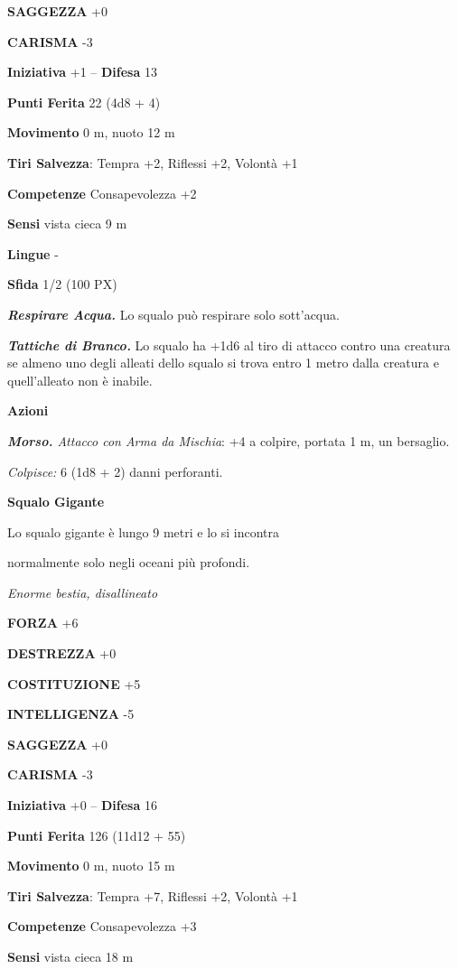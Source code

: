 \begin{multicols}{2}
	\textbf{SAGGEZZA} +0

	\textbf{CARISMA} -3

	\textbf{Iniziativa} +1 -- \textbf{Difesa} 13

	\textbf{Punti Ferita} 22 (4d8 + 4)

	\textbf{Movimento} 0 m, nuoto 12 m

	\textbf{Tiri Salvezza}: Tempra +2, Riflessi +2, Volontà +1

	\textbf{Competenze} Consapevolezza +2

	\textbf{Sensi} vista cieca 9 m

	\textbf{Lingue} -

	\textbf{Sfida} 1/2 (100 PX)

	\textit{\textbf{Respirare Acqua.}} Lo squalo può respirare solo sott'acqua.

	\textit{\textbf{Tattiche di Branco.}} Lo squalo ha +1d6 al tiro di attacco contro una creatura se almeno uno degli alleati dello squalo si trova entro 1 metro dalla creatura e quell'alleato non è inabile.

	\textbf{Azioni}

	\textit{\textbf{Morso.} Attacco con Arma da Mischia}: +4 a colpire, portata 1 m, un bersaglio.

	\textit{Colpisce:} 6 (1d8 + 2) danni perforanti.

	\medskip\textbf{Squalo Gigante}

	Lo squalo gigante è lungo 9 metri e lo si incontra

	normalmente solo negli oceani più profondi.

	\textit{Enorme bestia, disallineato}

	\textbf{FORZA} +6

	\textbf{DESTREZZA} +0

	\textbf{COSTITUZIONE} +5

	\textbf{INTELLIGENZA} -5

	\textbf{SAGGEZZA} +0

	\textbf{CARISMA} -3

	\textbf{Iniziativa} +0 -- \textbf{Difesa} 16

	\textbf{Punti Ferita} 126 (11d12 + 55)

	\textbf{Movimento} 0 m, nuoto 15 m

	\textbf{Tiri Salvezza}: Tempra +7, Riflessi +2, Volontà +1

	\textbf{Competenze} Consapevolezza +3

	\textbf{Sensi} vista cieca 18 m


\end{multicols}
